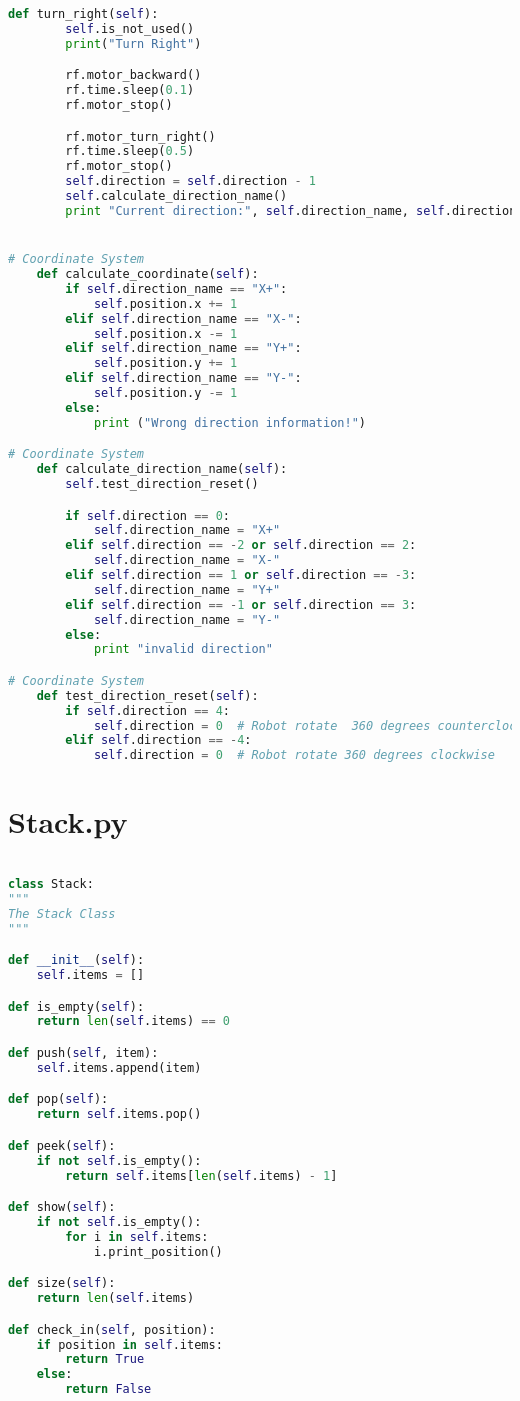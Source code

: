 \documentclass[11pt,times,oneside,openright,hardcopy]{eeereport}
\begin{document}
\begin{lstlisting}[language=Python]
    def turn_right(self):
        self.is_not_used()
        print("Turn Right")

        rf.motor_backward()
        rf.time.sleep(0.1)
        rf.motor_stop()

        rf.motor_turn_right()
        rf.time.sleep(0.5)
        rf.motor_stop()
        self.direction = self.direction - 1
        self.calculate_direction_name()
        print "Current direction:", self.direction_name, self.direction


# Coordinate System
    def calculate_coordinate(self):
        if self.direction_name == "X+":
            self.position.x += 1
        elif self.direction_name == "X-":
            self.position.x -= 1
        elif self.direction_name == "Y+":
            self.position.y += 1
        elif self.direction_name == "Y-":
            self.position.y -= 1
        else:
            print ("Wrong direction information!")

# Coordinate System
    def calculate_direction_name(self):
        self.test_direction_reset()

        if self.direction == 0:
            self.direction_name = "X+"
        elif self.direction == -2 or self.direction == 2:
            self.direction_name = "X-"
        elif self.direction == 1 or self.direction == -3:
            self.direction_name = "Y+"
        elif self.direction == -1 or self.direction == 3:
            self.direction_name = "Y-"
        else:
            print "invalid direction"

# Coordinate System
    def test_direction_reset(self):
        if self.direction == 4:
            self.direction = 0  # Robot rotate  360 degrees counterclockwise
        elif self.direction == -4:
            self.direction = 0  # Robot rotate 360 degrees clockwise

\end{lstlisting}

\section{Stack.py}
\begin{lstlisting}[language=Python]

class Stack:
"""
The Stack Class
"""

def __init__(self):
	self.items = []

def is_empty(self):
	return len(self.items) == 0

def push(self, item):
	self.items.append(item)

def pop(self):
	return self.items.pop()

def peek(self):
	if not self.is_empty():
		return self.items[len(self.items) - 1]

def show(self):
	if not self.is_empty():
		for i in self.items:
			i.print_position()

def size(self):
	return len(self.items)

def check_in(self, position):
	if position in self.items:
		return True
	else:
		return False

\end{lstlisting}
\end{document}
